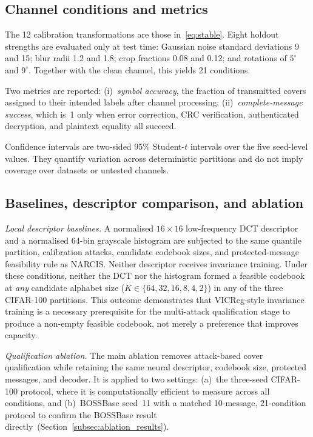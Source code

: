 \documentclass[10pt,journal]{IEEEtran}
\newcommand{\method}{NARCIS\xspace}
\begin{document}
\subsection{Channel conditions and metrics}

The 12 calibration transformations are those in~\eqref{eq:stable}.
Eight holdout strengths are evaluated only at test time: Gaussian
noise standard deviations 9 and 15; blur radii 1.2 and 1.8; crop
fractions 0.08 and 0.12; and rotations of $5^\circ$ and $9^\circ$.
Together with the clean channel, this yields 21 conditions.

Two metrics are reported: (i)~\emph{symbol accuracy}, the fraction of
transmitted covers assigned to their intended labels after channel
processing; (ii)~\emph{complete-message success}, which is~1 only when
error correction, CRC verification, authenticated decryption, and
plaintext equality all succeed.

Confidence intervals are two-sided 95\% Student-$t$ intervals over the
five seed-level values. They quantify variation across deterministic
partitions and do not imply coverage over datasets or untested channels.

\subsection{Baselines, descriptor comparison, and ablation}
\label{subsec:ablation}

\textit{Local descriptor baselines.} A normalised $16\times16$
low-frequency DCT descriptor and a normalised 64-bin grayscale
histogram are subjected to the same quantile partition, calibration
attacks, candidate codebook sizes, and protected-message feasibility
rule as \method. Neither descriptor receives invariance training.
Under these conditions, neither the DCT nor the histogram formed a
feasible codebook at \emph{any} candidate alphabet size ($K\in
\{64,32,16,8,4,2\}$) in any of the three CIFAR-100 partitions. This
outcome demonstrates that VICReg-style invariance training is a
necessary prerequisite for the multi-attack qualification stage to
produce a non-empty feasible codebook, not merely a preference that
improves capacity.

\textit{Qualification ablation.} The main ablation removes attack-based
cover qualification while retaining the same neural descriptor, codebook
size, protected messages, and decoder. It is applied to two settings:
(a)~the three-seed CIFAR-100 protocol, where it is computationally
efficient to measure across all conditions, and (b)~BOSSBase seed~11
with a matched 10-message, 21-condition protocol to confirm the
BOSSBase result directly~(Section~\ref{subsec:ablation_results}).
\end{document}
